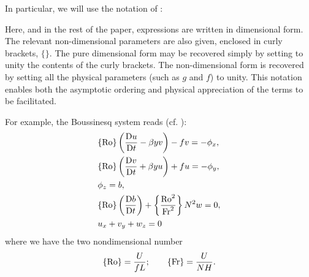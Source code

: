In particular, we will use the notation of \cite{Vallis_96a}:
\begin{displayquote}
    Here, and in the rest of the paper, expressions are written in dimensional form. The relevant non-dimensional parameters are also given, enclosed in curly brackets, $\{\}$. The pure dimensional form may be recovered simply by setting to unity the contents of the curly brackets. The non-dimensional form is recovered by setting all the physical parameters (such as $g$ and $f$) to unity. This notation enables both the asymptotic ordering and physical appreciation of the terms to be facilitated.
\end{displayquote}
For example, the Boussinesq system reads (cf. \cite[(PE.1-4)]{Vallis_17}):
\begin{align}
    &\{\text{Ro}\}\left(\frac{\mathrm{D} u}{\mathrm{D} t}-\beta y v\right)-fv = -\phi_x,\\
    &\{\text{Ro}\}\left(\frac{\mathrm{D} v}{\mathrm{D} t}+\beta y u\right)+fu = -\phi_y,\\
    &\phi_z = b,\\
    &\{\text{Ro}\}\left(\frac{\mathrm{D} b}{\mathrm{D} t}\right)+\left\{\frac{\text{Ro}^2}{\text{Fr}^2}\right\} N^2w = 0,\\
    &u_x+v_y+w_z = 0
\end{align}
where we have the two nondimensional number
\begin{align}
    \{\text{Ro}\} = \frac{U}{fL};\qquad \{\text{Fr}\} = \frac{U}{NH}.
\end{align}